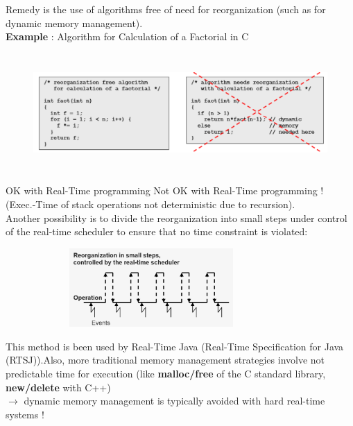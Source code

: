 Remedy is the use of algorithms free of need for reorganization (such as for dynamic memory management).\\
\newpage
\textbf{Example }: Algorithm for Calculation of a Factorial in C 

	\begin{figure}[h]
    \centering
    \includegraphics[width=14cm, height=4.5cm]{Images/image72.png}
    \label{fig:Fig 18}
    \end{figure}

OK with Real-Time programming   \hspace{1.5cm}   Not OK with Real-Time programming ! (Exec.-Time of stack  operations not deterministic due to recursion). \\

Another possibility is to divide the reorganization into small steps under control of the real-time scheduler to ensure that no time constraint is violated: 

	\begin{figure}[h]
    \centering
    \includegraphics[width=9cm, height=3cm]{Images/image73.png}
    \label{fig:Fig 19}
    \end{figure}

This method is been used by Real-Time Java (Real-Time Specification for Java (RTSJ)).Also, more traditional memory management strategies involve not predictable time for execution (like \textbf{malloc/free} of the C standard library, \textbf{new/delete} with C++)\\

$\rightarrow$ dynamic memory management is typically avoided with hard real-time systems !\\

